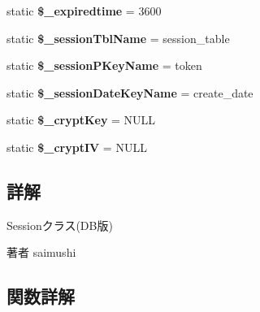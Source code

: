 \begin{DoxyCompactItemize}
\item 
\hypertarget{class_session_d_b_a6cba7150238d55cd1808d96711b606ff}{}static {\bfseries \$\+\_\+expiredtime} = 3600\label{class_session_d_b_a6cba7150238d55cd1808d96711b606ff}

\item 
\hypertarget{class_session_d_b_a930bfc49d979050e68aed7b0d5af3714}{}static {\bfseries \$\+\_\+session\+Tbl\+Name} = \textquotesingle{}session\+\_\+table\textquotesingle{}\label{class_session_d_b_a930bfc49d979050e68aed7b0d5af3714}

\item 
\hypertarget{class_session_d_b_a7e52248a2a3e71b6b34ff0d0b7db044c}{}static {\bfseries \$\+\_\+session\+P\+Key\+Name} = \textquotesingle{}token\textquotesingle{}\label{class_session_d_b_a7e52248a2a3e71b6b34ff0d0b7db044c}

\item 
\hypertarget{class_session_d_b_a76dd3d8e1aa17380d1011832973e808a}{}static {\bfseries \$\+\_\+session\+Date\+Key\+Name} = \textquotesingle{}create\+\_\+date\textquotesingle{}\label{class_session_d_b_a76dd3d8e1aa17380d1011832973e808a}

\item 
\hypertarget{class_session_d_b_a9c11760885b3822b5d0371e5b0d9a6bf}{}static {\bfseries \$\+\_\+crypt\+Key} = N\+U\+L\+L\label{class_session_d_b_a9c11760885b3822b5d0371e5b0d9a6bf}

\item 
\hypertarget{class_session_d_b_ae409b642296659751c419fea3e1a9cd2}{}static {\bfseries \$\+\_\+crypt\+I\+V} = N\+U\+L\+L\label{class_session_d_b_ae409b642296659751c419fea3e1a9cd2}

\end{DoxyCompactItemize}


\subsection{詳解}
Sessionクラス(D\+B版) \begin{DoxyAuthor}{著者}
saimushi 
\end{DoxyAuthor}


\subsection{関数詳解}
\hypertarget{class_session_d_b_ad31baeaf0488fd9f7d7cecb6ac10bfcc}{}
